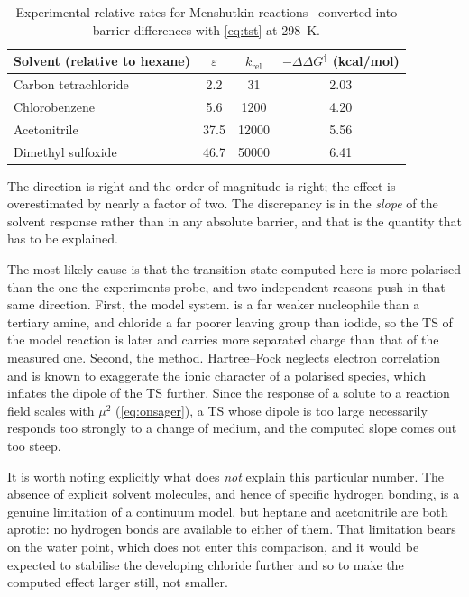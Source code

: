 \documentclass[10pt,a4paper]{article}
\begin{document}
\begin{table}[H]
  \centering
  \caption{Experimental relative rates for Menshutkin reactions~\cite{Reichardt2011}
    converted into barrier differences with \cref{eq:tst} at \SI{298}{\kelvin}.}
  \label{tab:exp}
  \small
  \begin{tabular}{l S[table-format=2.1] S[table-format=5.0] S[table-format=1.2]}
    \toprule
    Solvent (relative to hexane) & {$\varepsilon$} & {$k_\mathrm{rel}$} &
    {$-\Delta\Delta G^{\ddagger}$ (kcal/mol)} \\
    \midrule
    Carbon tetrachloride &  2.2 &    31 & 2.03 \\
    Chlorobenzene        &  5.6 &  1200 & 4.20 \\
    Acetonitrile         & 37.5 & 12000 & 5.56 \\
    Dimethyl sulfoxide   & 46.7 & 50000 & 6.41 \\
    \bottomrule
  \end{tabular}
\end{table}

\newpage
The direction is right and the order of magnitude is right; the effect is
overestimated by nearly a factor of two. The discrepancy is in the \emph{slope} of
the solvent response rather than in any absolute barrier, and that is the quantity
that has to be explained.

The most likely cause is that the transition state computed here is more polarised
than the one the experiments probe, and two independent reasons push in that same
direction. First, the model system.  is a far weaker nucleophile than a
tertiary amine, and chloride a far poorer leaving group than iodide, so the TS of the
model reaction is later and carries more separated charge than that of the measured
one. Second, the method. Hartree--Fock neglects electron correlation and is known to
exaggerate the ionic character of a polarised species, which inflates the dipole of
the TS further. Since the response of a solute to a reaction field scales with
$\mu^{2}$ (\cref{eq:onsager}), a TS whose dipole is too large necessarily responds
too strongly to a change of medium, and the computed slope comes out too steep.

It is worth noting explicitly what does \emph{not} explain this particular number.
The absence of explicit solvent molecules, and hence of specific hydrogen bonding,
is a genuine limitation of a continuum model, but heptane and acetonitrile are both
aprotic: no hydrogen bonds are available to either of them. That limitation bears on
the water point, which does not enter this comparison, and it would be expected to
stabilise the developing chloride further and so to make the computed effect larger
still, not smaller.
\end{document}
